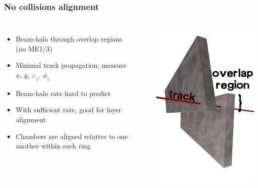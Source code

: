 \documentclass[compress]{beamer}
\begin{document}
\begin{frame}
\frametitle{No collisions alignment}

\vspace{-0.2 cm}
\begin{columns}
\begin{itemize}\setlength{\itemsep}{0.2 cm}
\item Beam-halo through overlap regions (no ME1/3)
\item Minimal track propagation, measure $x$, $y$, \textcolor{gray}{$\phi_y$,} $\phi_z$
\item Beam-halo rate hard to predict
\item With sufficient rate, good for layer alignment
\item Chambers are aligned relative to one another within each ring
\end{itemize}
\mbox{ }
\vspace{1 cm}

\includegraphics[width=\linewidth]{overlap.png}
\end{columns}


\end{frame}
\end{document}
